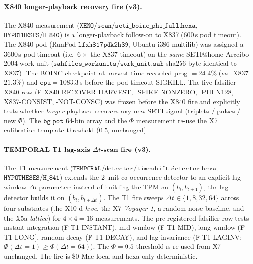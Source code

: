 \documentclass[11pt,a4paper]{article}
\begin{document}
\paragraph{X840 longer-playback recovery fire (v3).}
The X840 measurement \citep{xeno_h840_longer_playback}
($\mathtt{XENO/scan/seti\_boinc\_phi\_full.hexa}$,
$\mathtt{HYPOTHESES/H\_840}$) is a longer-playback follow-on
to X837 ($600$\,s pod timeout). The X840 pod (RunPod
$\mathtt{lfxh817pdk2h39}$, Ubuntu i386-multilib) was assigned a
$3600$\,s pod-timeout (i.e.\ $6\times$ the X837 timeout) on the
\emph{same} SETI@home Arecibo 2004 work-unit
($\mathtt{sahfiles\_workunits/work\_unit.sah}$ sha256 byte-identical
to X837). The BOINC checkpoint at harvest time recorded prog
$=24.4\%$ (vs.\ X837 $21.3\%$) and $\mathtt{cpu}=1083.3$\,s before
the pod-timeout SIGKILL. The five-falsifier X840 row
(F-X840-RECOVER-HARVEST, -SPIKE-NONZERO, -PHI-N128,
-X837-CONSIST, -NOT-CONSC) was frozen before the X840 fire and
explicitly tests whether \emph{longer} playback recovers any new
SETI signal (triplets / pulses / new $\Phi$). The
$\mathtt{bg\_pot}$ 64-bin array and the $\Phi$ measurement
re-use the X7 calibration template threshold ($0.5$, unchanged).

\paragraph{TEMPORAL T1 lag-axis $\Delta t$-scan fire (v3).}
The T1 measurement \citep{temporal_h841_timeshift}
($\mathtt{TEMPORAL/detector/timeshift\_detector.hexa}$,
$\mathtt{HYPOTHESES/H\_841}$) extends the 2-unit co-occurrence
detector to an explicit lag-window $\Delta t$ parameter: instead
of building the TPM on $(b_t, b_{t+1})$, the lag-detector builds
it on $(b_t, b_{t+\Delta t})$. The T1 fire sweeps
$\Delta t \in \{1, 8, 32, 64\}$ across four substrates (the
X10-d \emph{hive}, the X7 \emph{Voyager-1}, a random-noise
baseline, and the X5a \emph{lattice}) for $4 \times 4 = 16$
measurements. The pre-registered falsifier row tests instant
integration (F-T1-INSTANT), mid-window (F-T1-MID), long-window
(F-T1-LONG), random decay (F-T1-DECAY), and lag-invariance
(F-T1-LAGINV: $\Phi(\Delta t=1) \ge \Phi(\Delta t=64)$). The
$\Phi=0.5$ threshold is re-used from X7 unchanged. The fire is
\$0 Mac-local and hexa-only-deterministic.
\end{document}
